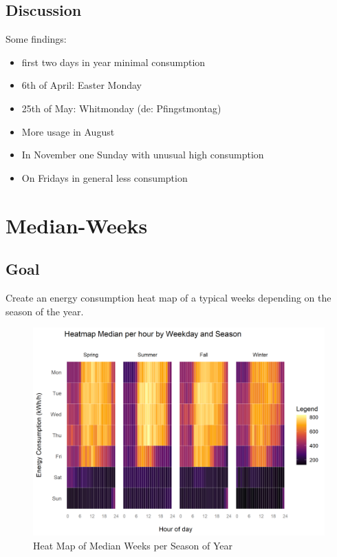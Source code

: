 \documentclass[
]{book}
\begin{document}
\hypertarget{discussion-5}{%
\subsection{Discussion}\label{discussion-5}}

Some findings:

\begin{itemize}
\item
  first two days in year minimal consumption
\item
  6th of April: Easter Monday
\item
  25th of May: Whitmonday (de: Pfingstmontag)
\item
  More usage in August
\item
  In November one Sunday with unusual high consumption
\item
  On Fridays in general less consumption
\end{itemize}

\hypertarget{median-weeks}{%
\section{Median-Weeks}\label{median-weeks}}

\hypertarget{goal-7}{%
\subsection{Goal}\label{goal-7}}

Create an energy consumption heat map of a typical weeks depending on the season of the year.

\begin{figure}
\includegraphics[width=0.7\linewidth]{images/plotHeatMapMedianWeeks} \caption{Heat Map of Median Weeks per Season of Year}\label{fig:unnamed-chunk-16}
\end{figure}
\end{document}
